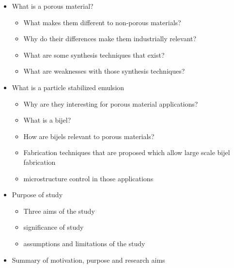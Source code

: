 \begin{itemize}
    \item What is a porous material? 
    \begin{itemize}
        \item What makes them different to non-porous materials?
        \item Why do their differences make them industrially relevant?
        \item What are some synthesis techniques that exist?
        \item What are weaknesses with those synthesis techniques?
    \end{itemize}
    \item What is a particle stabilized emulsion
    \begin{itemize}
        \item Why are they interesting for porous material applications?
        \item What is a bijel?
        \item How are bijels relevant to porous materials?
        \item Fabrication techniques that are proposed which allow large scale bijel fabrication
        \item microstructure control in those applications
    \end{itemize}
    \item Purpose of study
    \begin{itemize}
        \item Three aims of the study 
        \item significance of study
        \item assumptions and limitations of the study
    \end{itemize}
    \item Summary of motivation, purpose and research aims
\end{itemize}



